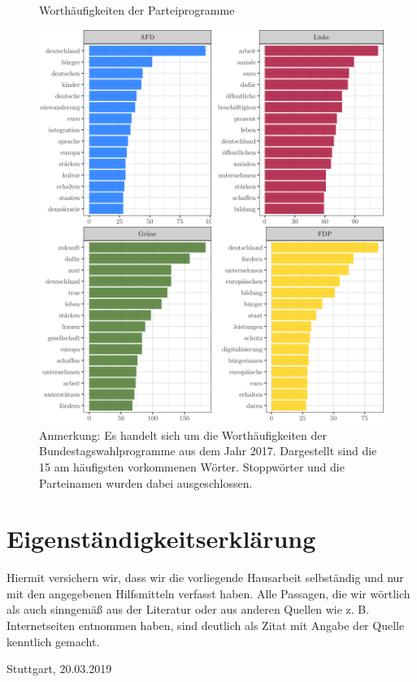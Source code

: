 \begin{figure}[!h]
	\caption{Worthäufigkeiten der Parteiprogramme}
	\label{word_freq}
	\centering
	\includegraphics[width=\textwidth]{images/word_freq_total.png}
	\caption*{\scriptsize Anmerkung: Es handelt sich um die Worthäufigkeiten der Bundestagswahlprogramme aus dem Jahr 2017. Dargestellt sind die 15 am häufigsten vorkommenen Wörter. Stoppwörter und die Parteinamen wurden dabei ausgeschlossen.}
\end{figure}



\clearpage
\section*{Eigenständigkeitserklärung}
\vspace*{2cm}
\begin{center}
	\begin{minipage}[t]{0.8\textwidth}
		Hiermit versichern wir, dass wir die vorliegende Hausarbeit selbständig und nur mit den angegebenen Hilfsmitteln verfasst haben. Alle Passagen, die wir wörtlich als auch sinngemäß aus der Literatur oder aus anderen Quellen wie z. B. Internetseiten entnommen haben, sind deutlich als Zitat mit Angabe der Quelle kenntlich gemacht.
		
		\vspace*{60mm}
		Stuttgart, 20.03.2019
	\end{minipage}
\end{center}




